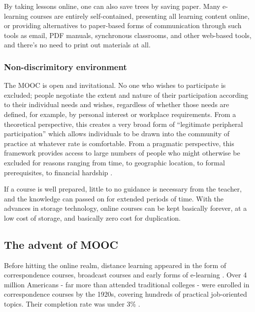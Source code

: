 By taking lessons online, one can also save trees by saving paper. Many
e-learning courses are entirely self-contained, presenting all learning content
online, or providing alternatives to paper-based forms of communication through
such tools as email, PDF manuals, synchronous classrooms, and other web-based
tools, and there's no need to print out materials at all.

\subsubsection{Non-discrimitory environment}
The MOOC is open and invitational. No one who wishes to participate is excluded;
people negotiate the extent and nature of their participation according to their
individual needs and wishes, regardless of whether those needs are defined, for
example, by personal interest or workplace requirements. From a theoretical
perspective, this creates a very broad form of “legitimate peripheral
participation” \citep{wegner} which allows individuals to be drawn into the
community of practice at whatever rate is comfortable. From a pragmatic
perspective, this framework provides access to large numbers of people who
might otherwise be excluded for reasons ranging from time, to geographic
location, to formal prerequisites, to financial hardship \citep{wegner}.

If a course is well prepared, little to no guidance is necessary from the
teacher, and the knowledge can passed on for extended periods of time. With the
advances in storage technology, online courses can be kept basically forever, at
a low cost of storage, and basically zero cost for duplication.

\subsection{The advent of MOOC}
Before hitting the online realm, distance learning appeared in the form of
correspondence courses, broadcast courses and early forms of
e-learning \citep{history_of_instr_tech}. Over 4 million Americans
- far more than attended traditional colleges - were enrolled in correspondence
courses by the 1920s, covering hundreds of practical job-oriented topics. Their
completion rate was under 3\% \citep{pursuit_of_knowledge}.

